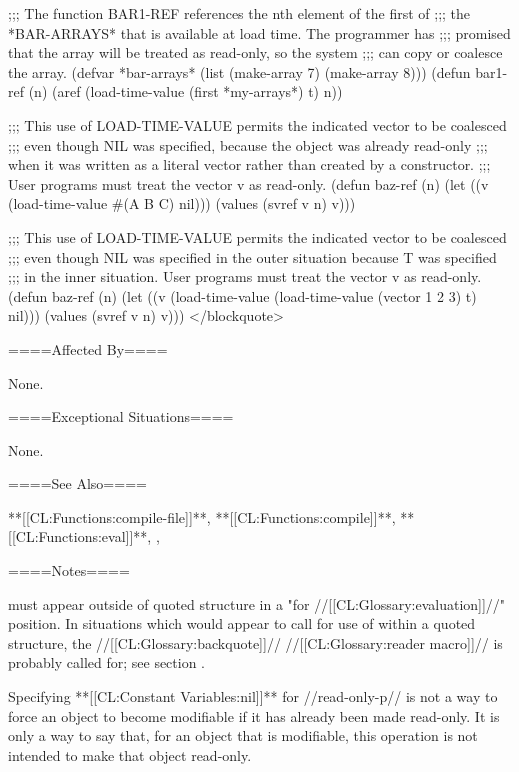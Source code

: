 ;;; The function BAR1-REF references the nth element of the first of ;;; the *BAR-ARRAYS* that is available at load time. The programmer has ;;; promised that the array will be treated as read-only, so the system ;;; can copy or coalesce the array. (defvar *bar-arrays* (list (make-array 7) (make-array 8))) (defun bar1-ref (n) (aref (load-time-value (first *my-arrays*) t) n))

;;; This use of LOAD-TIME-VALUE permits the indicated vector to be coalesced ;;; even though NIL was specified, because the object was already read-only ;;; when it was written as a literal vector rather than created by a constructor. ;;; User programs must treat the vector v as read-only. (defun baz-ref (n) (let ((v (load-time-value #(A B C) nil))) (values (svref v n) v)))

;;; This use of LOAD-TIME-VALUE permits the indicated vector to be coalesced ;;; even though NIL was specified in the outer situation because T was specified ;;; in the inner situation. User programs must treat the vector v as read-only. (defun baz-ref (n) (let ((v (load-time-value (load-time-value (vector 1 2 3) t) nil))) (values (svref v n) v))) </blockquote>

====Affected By====

None.

====Exceptional Situations====

None.

====See Also====

**[[CL:Functions:compile-file]]**, **[[CL:Functions:compile]]**, **[[CL:Functions:eval]]**, {\secref\MinimalCompilation}, {\secref\Compilation}

====Notes====

 must appear outside of quoted structure in a "for //[[CL:Glossary:evaluation]]//" position. In situations which would appear to call for use of  within a quoted structure, the //[[CL:Glossary:backquote]]// //[[CL:Glossary:reader macro]]// is probably called for; see section {\secref\Backquote}.

Specifying **[[CL:Constant Variables:nil]]** for //read-only-p// is not a way to force an object to become modifiable if it has already been made read-only. It is only a way to say that, for an object that is modifiable, this operation is not intended to make that object read-only.



